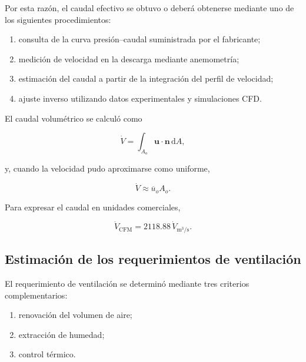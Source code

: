 Por esta razón, el caudal efectivo se obtuvo o deberá obtenerse mediante uno de los siguientes procedimientos:

\begin{enumerate}
    \item consulta de la curva presión--caudal suministrada por el fabricante;
    \item medición de velocidad en la descarga mediante anemometría;
    \item estimación del caudal a partir de la integración del perfil de velocidad;
    \item ajuste inverso utilizando datos experimentales y simulaciones CFD.
\end{enumerate}

El caudal volumétrico se calculó como

\begin{equation}
\dot V
=
\int_{A_o}
\mathbf{u}\cdot\mathbf{n}\,\mathrm{d}A,
\label{eq:caudal_integral_actuador}
\end{equation}

y, cuando la velocidad pudo aproximarse como uniforme,

\begin{equation}
\dot V
\approx
\overline{u}_o A_o.
\label{eq:caudal_promedio_actuador}
\end{equation}

Para expresar el caudal en unidades comerciales,

\begin{equation}
\dot V_{\mathrm{CFM}}
=
2118.88\,
\dot V_{\mathrm{m^3/s}}.
\label{eq:conversion_cfm}
\end{equation}

\subsection{Estimación de los requerimientos de ventilación}
\label{subsec:requerimientos_ventilacion}

El requerimiento de ventilación se determinó mediante tres criterios complementarios:

\begin{enumerate}
    \item renovación del volumen de aire;
    \item extracción de humedad;
    \item control térmico.
\end{enumerate}

